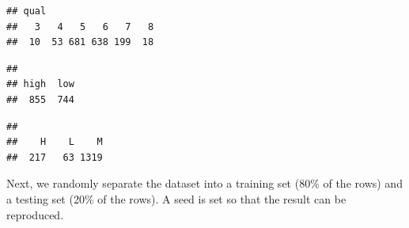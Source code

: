 \documentclass[
]{book}
\newenvironment{Shaded}{\begin{snugshade}}{\end{snugshade}}
\newcommand{\CommentTok}[1]{\textcolor[rgb]{0.56,0.35,0.01}{\textit{#1}}}
\newcommand{\DecValTok}[1]{\textcolor[rgb]{0.00,0.00,0.81}{#1}}
\newcommand{\FunctionTok}[1]{\textcolor[rgb]{0.13,0.29,0.53}{\textbf{#1}}}
\newcommand{\NormalTok}[1]{#1}
\newcommand{\OtherTok}[1]{\textcolor[rgb]{0.56,0.35,0.01}{#1}}
\newcommand{\SpecialCharTok}[1]{\textcolor[rgb]{0.81,0.36,0.00}{\textbf{#1}}}
\newcommand{\StringTok}[1]{\textcolor[rgb]{0.31,0.60,0.02}{#1}}
\begin{document}
\begin{Shaded}
\end{Shaded}

\begin{verbatim}
## qual
##   3   4   5   6   7   8 
##  10  53 681 638 199  18
\end{verbatim}

\begin{Shaded}
\end{Shaded}

\begin{verbatim}
## 
## high  low 
##  855  744
\end{verbatim}

\begin{Shaded}
\end{Shaded}

\begin{verbatim}
## 
##    H    L    M 
##  217   63 1319
\end{verbatim}

Next, we randomly separate the dataset into a training set (80\% of the rows) and a testing set (20\% of the rows). A seed is set so that the result can be reproduced.
\end{document}
